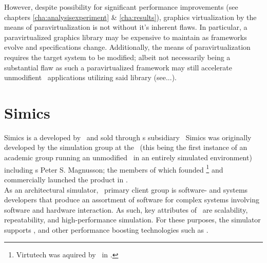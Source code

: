However, despite possibility for significant performance improvements (see chapters \ref{cha:analysisexperiment} \& \ref{cha:results}), graphics virtualization by the means of paravirtualization is not without it's inherent flaws.
In particular, a paravirtualized graphics library may be expensive to maintain as frameworks evolve and specifications change.
Additionally, the means of paravirtualization requires the target system to be modified; albeit not necessarily being a substantial flaw as such a paravirtualized framework may still accelerate unmodifient \dvttermtarget\ applications utilizing said library (see...).



\section{Simics}
\label{sec:background_simics}
Simics is a  developed by \dvttermintel\ and sold through \dvttermintel s subsidiary \dvttermwindriver\
Simics was originally developed by the simulation group at the \dvttermsics\ (this being the first instance of an academic group running an unmodified \dvttermos\ in an entirely simulated environment) including \dvttermgoogle s Peter S. Magnusson; the members of which founded \dvttermvirtutech \footnote{Virtutech was aquired by \dvttermintel\ in .} and commercially launched the product in .\\

\noindent
As an architectural simulator, \dvttermsimics\ primary client group is software- and systems developers that produce an assortment of software for complex systems involving software and hardware interaction.
As such, key attributes of \dvttermsimics\ are scalability, repeatability, and high-performance simulation.
For these purposes, the simulator supports \dvttermhostvirtualizationextensions , and other performance boosting technologies such as \dvttermhypersimulation {}.

